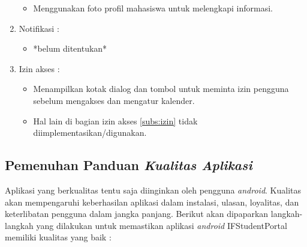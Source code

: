 \begin{enumerate}
\begin{itemize}
        \item Menggunakan foto profil mahasiswa untuk melengkapi informasi.
        \end{itemize}
    \item Notifikasi : 
    \begin{itemize}
        \item *belum ditentukan*
        \end{itemize}
    \item Izin akses : 
    \begin{itemize}
        \item Menampilkan kotak dialog dan tombol untuk meminta izin pengguna sebelum mengakses dan mengatur kalender.
        \item Hal lain di bagian izin akses \ref{subs:izin} tidak diimplementasikan/digunakan.
        \end{itemize}
\end{enumerate}

\subsection{Pemenuhan Panduan \textit{Kualitas Aplikasi}}
Aplikasi yang berkualitas tentu saja diinginkan oleh pengguna \textit{android}. Kualitas akan mempengaruhi keberhasilan aplikasi dalam instalasi, ulasan, loyalitas, dan keterlibatan pengguna  dalam jangka panjang. Berikut akan dipaparkan langkah-langkah yang dilakukan untuk memastikan aplikasi \textit{android} IFStudentPortal memiliki kualitas yang baik :

